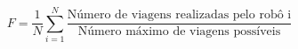 \documentclass{article}
\begin{document}
\thispagestyle{empty}

$$
F = \frac{1}{N} \sum_{i=1}^{N} \frac{\text{Número de viagens realizadas pelo robô i}}{\text{Número máximo de viagens possíveis}}
$$
\end{document}
